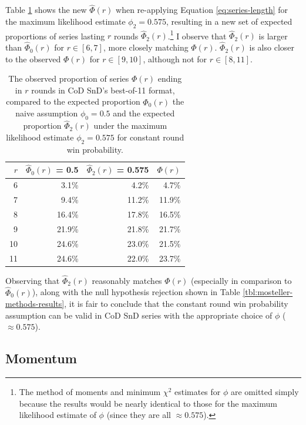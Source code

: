 \documentclass{article}
\begin{document}
Table \ref{tbl:expected-series-lengths-alternative-ps} shows the new
\(\hat{\Phi}(r)\) when re-applying Equation \ref{eq:series-length} for
the maximum likelihood estimate \(\phi_2 = 0.575\), resulting in a new
set of expected proportions of series lasting \(r\) rounds
\(\hat{\Phi}_2(r)\).\footnote{The method of moments and minimum
  \(\chi^2\) estimates for \(\phi\) are omitted simply because the
  results would be nearly identical to those for the maximum likelihood
  estimate of \(\phi\) (since they are all \(\approx 0.575\)).} I
observe that \(\hat{\Phi}_2(r)\) is larger than \(\hat{\Phi}_0(r)\) for
\(r \in [6, 7]\), more closely matching \(\Phi(r)\). \(\hat{\Phi}_2(r)\)
is also closer to the observed \(\Phi(r)\) for \(r \in [9, 10]\),
although not for \(r \in [8, 11]\).

\begin{longtable}[]{@{}rrrr@{}}
\caption{The observed proportion of series $\Phi(r)$ ending in $r$ rounds in CoD SnD's best-of-11 format, compared to the expected proportion $\hat{\Phi}_0(r)$ the naive assumption $\phi_0 = 0.5$ and the expected proportion $\hat{\Phi}_2(r)$ under the maximum likelihood estimate $\phi_2 = 0.575$ for constant round win probability.}\label{tbl:expected-series-lengths-alternative-ps} \\
\toprule()
$r$ & $\hat{\Phi}_0(r)$ = 0.5 & $\hat{\Phi}_2(r)$ = 0.575 & $\Phi(r)$ \\
\midrule()
\endhead
6 & 3.1\% & 4.2\% & 4.7\% \\
7 & 9.4\% & 11.2\% & 11.9\% \\
8 & 16.4\% & 17.8\% & 16.5\% \\
9 & 21.9\% & 21.8\% & 21.7\% \\
10 & 24.6\% & 23.0\% & 21.5\% \\
11 & 24.6\% & 22.0\% & 23.7\% \\
\bottomrule()
\end{longtable}

Observing that \(\hat{\Phi}_2(r)\) reasonably matches \(\Phi(r)\)
(especially in comparison to \(\hat{\Phi}_0(r)\)), along with the null
hypothesis rejection shown in Table \ref{tbl:mosteller-methods-results},
it is fair to conclude that the constant round win probability
assumption can be valid in CoD SnD series with the appropriate choice of
\(\phi\) (\(\approx 0.575\)).

\hypertarget{sec:results-momentum}{%
\subsection{Momentum}\label{sec:results-momentum}}
\end{document}
